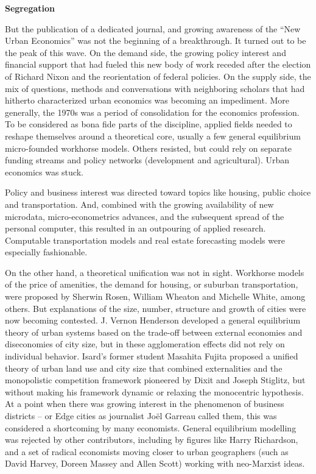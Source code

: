 \documentclass[
]{book}
\begin{document}
\textbf{Segregation}

But the publication of a dedicated journal, and growing awareness of the ``New Urban Economics'' was not the beginning of a breakthrough. It turned out to be the peak of this wave. On the demand side, the growing policy interest and financial support that had fueled this new body of work receded after the election of Richard Nixon and the reorientation of federal policies. On the supply side, the mix of questions, methods and conversations with neighboring scholars that had hitherto characterized urban economics was becoming an impediment. More generally, the 1970s was a period of consolidation for the economics profession. To be considered as bona fide parts of the discipline, applied fields needed to reshape themselves around a theoretical core, usually a few general equilibrium micro-founded workhorse models.
Others resisted, but could rely on separate funding streams and policy networks (development and agricultural). Urban economics was stuck.

Policy and business interest was directed toward topics like housing, public choice and transportation. And, combined with the growing availability of new microdata, micro-econometrics advances, and the subsequent spread of the personal computer, this resulted in an outpouring of applied research. Computable transportation models and real estate forecasting models were especially fashionable.

On the other hand, a theoretical unification was not in sight. Workhorse models of the price of amenities, the demand for housing, or suburban transportation, were proposed by Sherwin Rosen, William Wheaton and Michelle White, among others. But explanations of the size, number, structure and growth of cities were now becoming contested. J. Vernon Henderson developed a general equilibrium theory of urban systems based on the trade-off between external economies and diseconomies of city size, but in these agglomeration effects did not rely on individual behavior. Isard's former student Masahita Fujita proposed a unified theory of urban land use and city size that combined externalities and the monopolistic competition framework pioneered by Dixit and Joseph Stiglitz, but without making his framework dynamic or relaxing the monocentric hypothesis. At a point when there was growing interest in the phenomenon of business districts -- or Edge cities as journalist Joël Garreau called them, this was considered a shortcoming by many economists. General equilibrium modelling was rejected by other contributors, including by figures like Harry Richardson, and a set of radical economists moving closer to urban geographers (such as David Harvey, Doreen Massey and Allen Scott) working with neo-Marxist ideas.
\end{document}
